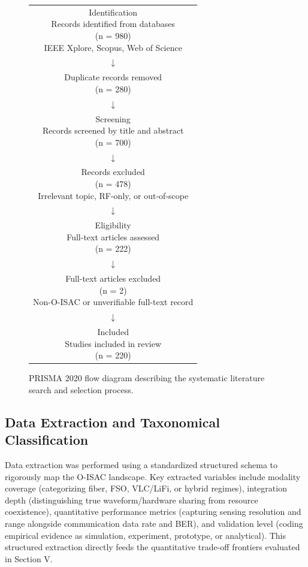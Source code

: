 \documentclass[lettersize,journal]{IEEEtran}
\begin{document}
\begin{figure}[!t]
\centering
\setlength{\tabcolsep}{4pt}
\renewcommand{\arraystretch}{1.15}
\begin{tabular}{c}
\fbox{\parbox{0.92\linewidth}{\centering Identification\\Records identified from databases\\(n = 980)\\IEEE Xplore, Scopus, Web of Science}} \\
$\downarrow$ \\
\fbox{\parbox{0.92\linewidth}{\centering Duplicate records removed\\(n = 280)}} \\
$\downarrow$ \\
\fbox{\parbox{0.92\linewidth}{\centering Screening\\Records screened by title and abstract\\(n = 700)}} \\
$\downarrow$ \\
\fbox{\parbox{0.92\linewidth}{\centering Records excluded\\(n = 478)\\Irrelevant topic, RF-only, or out-of-scope}} \\
$\downarrow$ \\
\fbox{\parbox{0.92\linewidth}{\centering Eligibility\\Full-text articles assessed\\(n = 222)}} \\
$\downarrow$ \\
\fbox{\parbox{0.92\linewidth}{\centering Full-text articles excluded\\(n = 2)\\Non-O-ISAC or unverifiable full-text record}} \\
$\downarrow$ \\
\fbox{\parbox{0.92\linewidth}{\centering Included\\Studies included in review\\(n = 220)}}
\end{tabular}
\caption{PRISMA 2020 flow diagram describing the systematic literature search and selection process.}
\label{fig:fig_iii_1}
\end{figure}

\subsection{Data Extraction and Taxonomical Classification}
Data extraction was performed using a standardized structured schema to rigorously map the O-ISAC landscape. Key extracted variables include modality coverage (categorizing fiber, FSO, VLC/LiFi, or hybrid regimes), integration depth (distinguishing true waveform/hardware sharing from resource coexistence), quantitative performance metrics (capturing sensing resolution and range alongside communication data rate and BER), and validation level (coding empirical evidence as simulation, experiment, prototype, or analytical). This structured extraction directly feeds the quantitative trade-off frontiers evaluated in Section V.
\end{document}
